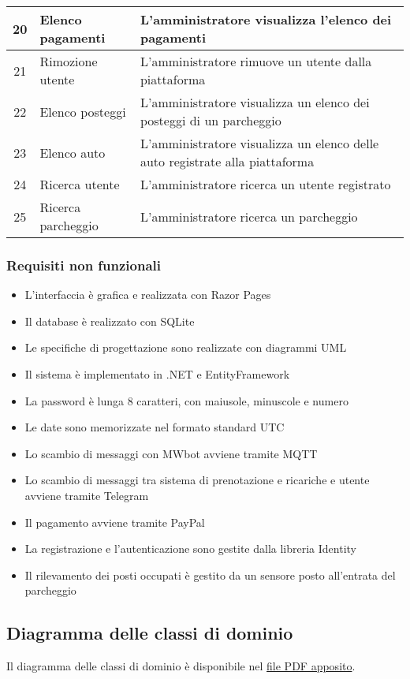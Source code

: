 \documentclass{article}
\begin{document}
\begin{longtable}{|c|p{3cm}|p{7cm}|}
         \hline
         20 & Elenco pagamenti & L'amministratore visualizza l'elenco dei pagamenti \\
         \hline
         21 & Rimozione utente & L'amministratore rimuove un utente dalla piattaforma \\
         \hline
         22 & Elenco posteggi & L'amministratore visualizza un elenco dei posteggi di un parcheggio \\
         \hline
         23 & Elenco auto & L'amministratore visualizza un elenco delle auto registrate alla piattaforma \\
         \hline
         24 & Ricerca utente & L'amministratore ricerca un utente registrato \\
         \hline
         25 & Ricerca parcheggio & L'amministratore ricerca un parcheggio \\
         \hline
    \end{longtable}
\subsubsection{Requisiti non funzionali}
\begin{itemize}
    \item L'interfaccia è grafica e realizzata con Razor Pages
    \item Il database è realizzato con SQLite
    \item Le specifiche di progettazione sono realizzate con diagrammi UML
    \item Il sistema è implementato in .NET e EntityFramework
    \item La password è lunga 8 caratteri, con maiusole, minuscole e numero
    \item Le date sono memorizzate nel formato standard UTC
    \item Lo scambio di messaggi con MWbot avviene tramite MQTT
    \item Lo scambio di messaggi tra sistema di prenotazione e ricariche e utente avviene tramite Telegram
    \item Il pagamento avviene tramite PayPal
    \item La registrazione e l'autenticazione sono gestite dalla libreria Identity
    \item Il rilevamento dei posti occupati è gestito da un sensore posto all'entrata del parcheggio
\end{itemize}
\subsection{Diagramma delle classi di dominio}
Il diagramma delle classi di dominio è disponibile nel \href{run:./dominio.pdf}{file PDF apposito}.
\end{document}

